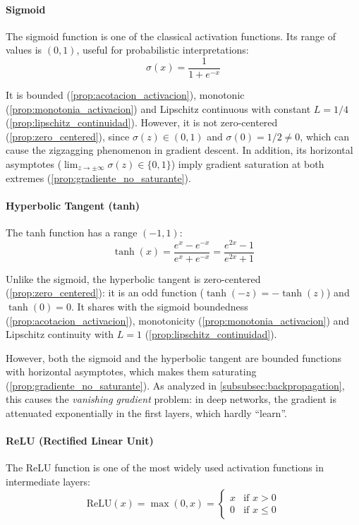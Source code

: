 \paragraph{Sigmoid}

The sigmoid function is one of the classical activation functions. Its range of values is $(0, 1)$, useful for probabilistic interpretations:
\[
\sigma(x) = \frac{1}{1 + e^{-x}}
\]

It is bounded (\autoref{prop:acotacion_activacion}), monotonic (\autoref{prop:monotonia_activacion}) and Lipschitz continuous with constant $L = 1/4$ (\autoref{prop:lipschitz_continuidad}). However, it is not zero-centered (\autoref{prop:zero_centered}), since $\sigma(z) \in (0,1)$ and $\sigma(0) = 1/2 \neq 0$, which can cause the zigzagging phenomenon in gradient descent. In addition, its horizontal asymptotes ($\lim_{z\to\pm\infty}\sigma(z) \in \{0,1\}$) imply gradient saturation at both extremes (\autoref{prop:gradiente_no_saturante}).

\paragraph{Hyperbolic Tangent (tanh)}

The tanh function has a range $(-1, 1)$:
\[
\tanh(x) = \frac{e^x - e^{-x}}{e^x + e^{-x}} = \frac{e^{2x} - 1}{e^{2x} + 1}
\]

Unlike the sigmoid, the hyperbolic tangent is zero-centered (\autoref{prop:zero_centered}): it is an odd function ($\tanh(-z) = -\tanh(z)$) and $\tanh(0) = 0$. It shares with the sigmoid boundedness (\autoref{prop:acotacion_activacion}), monotonicity (\autoref{prop:monotonia_activacion}) and Lipschitz continuity with $L = 1$ (\autoref{prop:lipschitz_continuidad}).

However, both the sigmoid and the hyperbolic tangent are bounded functions with horizontal asymptotes, which makes them saturating (\autoref{prop:gradiente_no_saturante}). As analyzed in \autoref{subsubsec:backpropagation}, this causes the \textit{vanishing gradient} problem: in deep networks, the gradient is attenuated exponentially in the first layers, which hardly ``learn''.

\paragraph{ReLU (Rectified Linear Unit)}

The \gls{ReLU} function is one of the most widely used activation functions in intermediate layers:
\[
\text{ReLU}(x) = \max(0, x) = \begin{cases}
x & \text{if } x > 0 \\
0 & \text{if } x \leq 0
\end{cases}
\]

